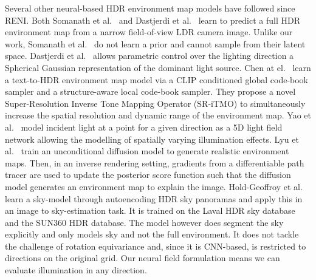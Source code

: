 Several other neural-based HDR environment map models have followed since RENI. Both Somanath et al.~\cite{Somanath_2021_CVPR} and Dastjerdi et al.~\cite{dastjerdiEverLightIndoorOutdoorEditable2023} learn to predict a full HDR environment map from a narrow field-of-view LDR camera image. Unlike our work, Somanath et al.~\cite{Somanath_2021_CVPR} do not learn a prior and cannot sample from their latent space. Dastjerdi et al.~\cite{dastjerdiEverLightIndoorOutdoorEditable2023} allows parametric control over the lighting direction a Spherical Gaussian representation of the dominant light source. Chen at el.~\cite{chenText2LightZeroShotTextDriven2022} learn a text-to-HDR environment map model via a CLIP \cite{radfordLearningTransferableVisual2021} conditioned global code-book sampler and a structure-aware local code-book sampler. They propose a novel Super-Resolution Inverse Tone Mapping Operator (SR-iTMO) to simultaneously increase the spatial resolution
and dynamic range of the environment map. Yao et al.~\cite{yaoNeILFNeuralIncident2022} model incident light at a point for a given direction as a 5D light field network allowing the modelling of spatially varying illumination effects. Lyu et al.~\cite{lyuDiffusionPosteriorIllumination2023a} train an unconditional diffusion model \cite{hoDenoisingDiffusionProbabilistic2020} to generate realistic environment maps. Then, in an inverse rendering setting, gradients from a differentiable path tracer are used to update the posterior score function such that the diffusion model generates an environment map to explain the image. Hold-Geoffroy et al.~\cite{Hold-Geoffroy_2019_CVPR} learn a sky-model through autoencoding HDR sky panoramas and apply this in an image to sky-estimation task. It is trained on the Laval HDR sky database and the SUN360 HDR database. The model however does segment the sky explicitly and only models sky and not the full environment. It does not tackle the challenge of rotation equivariance and, since it is CNN-based, is restricted to directions on the original grid. Our neural field formulation means we can evaluate illumination in any direction.

